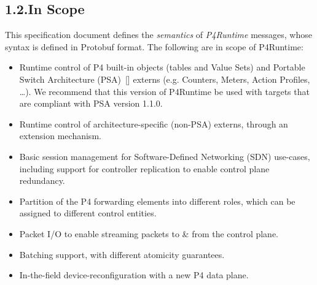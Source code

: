 \documentclass[11pt]{article}
\begin{document}
{%
\subsection{1.2.\hspace*{0.5em}In Scope}\label{sec-in-scope}%

\noindent{}This specification document defines the \emph{semantics} of \emph{P4Runtime} messages,
whose syntax is defined in Protobuf format. The following are in scope of
P4Runtime:%

\begin{itemize}[noitemsep,topsep=\mdcompacttopsep]%

\item{}Runtime control of P4 built-in objects (tables and Value Sets) and Portable
Switch Architecture (PSA)~[] externs (e.g. Counters, Meters, Action
Profiles, \dots{}). We recommend that this version of P4Runtime be used with
targets that are compliant with PSA version 1.1.0.%

\item{}Runtime control of architecture-specific (non-PSA) externs, through an
extension mechanism.%

\item{}Basic session management for Software-Defined Networking (SDN) use-cases,
including support for controller replication to enable control plane
redundancy.%

\item{}Partition of the P4 forwarding elements into different roles, which can be
assigned to different control entities.%

\item{}Packet I/O to enable streaming packets to \& from the control plane.%

\item{}Batching support, with different atomicity guarantees.%

\item{}In-the-field device-reconfiguration with a new P4 data plane.%
\end{itemize}%

}
\end{document}
